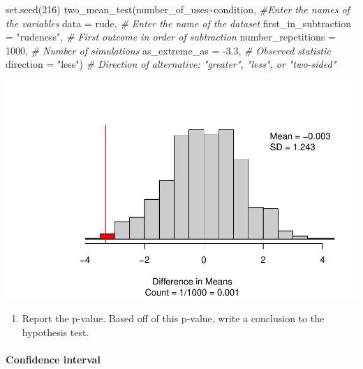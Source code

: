 \documentclass[
]{report}
\newenvironment{Shaded}{\begin{snugshade}}{\end{snugshade}}
\newcommand{\AttributeTok}[1]{\textcolor[rgb]{0.77,0.63,0.00}{#1}}
\newcommand{\CommentTok}[1]{\textcolor[rgb]{0.56,0.35,0.01}{\textit{#1}}}
\newcommand{\DecValTok}[1]{\textcolor[rgb]{0.00,0.00,0.81}{#1}}
\newcommand{\FloatTok}[1]{\textcolor[rgb]{0.00,0.00,0.81}{#1}}
\newcommand{\FunctionTok}[1]{\textcolor[rgb]{0.00,0.00,0.00}{#1}}
\newcommand{\NormalTok}[1]{#1}
\newcommand{\SpecialCharTok}[1]{\textcolor[rgb]{0.00,0.00,0.00}{#1}}
\newcommand{\StringTok}[1]{\textcolor[rgb]{0.31,0.60,0.02}{#1}}
\providecommand{\tightlist}{%
  \setlength{\itemsep}{0pt}\setlength{\parskip}{0pt}}
\begin{document}
\begin{Shaded}
\begin{Highlighting}[]
\FunctionTok{set.seed}\NormalTok{(}\DecValTok{216}\NormalTok{)}
\FunctionTok{two\_mean\_test}\NormalTok{(number\_of\_uses}\SpecialCharTok{\textasciitilde{}}\NormalTok{condition, }\CommentTok{\#Enter the names of the variables}
              \AttributeTok{data =}\NormalTok{ rude,  }\CommentTok{\# Enter the name of the dataset}
              \AttributeTok{first\_in\_subtraction =} \StringTok{"rudeness"}\NormalTok{, }\CommentTok{\# First outcome in order of subtraction}
              \AttributeTok{number\_repetitions =} \DecValTok{1000}\NormalTok{,  }\CommentTok{\# Number of simulations}
              \AttributeTok{as\_extreme\_as =} \SpecialCharTok{{-}}\FloatTok{3.3}\NormalTok{,  }\CommentTok{\# Observed statistic}
              \AttributeTok{direction =} \StringTok{"less"}\NormalTok{)  }\CommentTok{\# Direction of alternative: "greater", "less", or "two{-}sided"}
\end{Highlighting}
\end{Shaded}

\begin{center}\includegraphics[width=0.7\linewidth]{12-OCA09-inference-1ofeach-simulation_files/figure-latex/unnamed-chunk-4-1} \end{center}

\newpage

\begin{enumerate}
\def\labelenumi{\arabic{enumi}.}
\setcounter{enumi}{15}
\tightlist
\item
  Report the p-value. Based off of this p-value, write a conclusion to the hypothesis test.
\end{enumerate}

\vspace{0.8in}

\hypertarget{confidence-interval-6}{%
\paragraph*{Confidence interval}\label{confidence-interval-6}}
\end{document}
